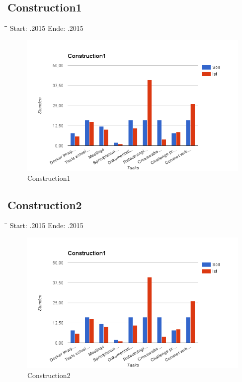 \subsection{Construction1}
\begin{tabbing}[H]
    \hspace*{3cm}\=\hspace*{5cm}\=\hspace*{3cm}\=\hspace*{3cm}\= \kill
    Start: .2015 \>	Ende: .2015 \\
\end{tabbing}
\begin{figure}[H]
\centering
\includegraphics[width=390pt]{images/construction1.png}
\caption[Construction1]{Construction1}
\end{figure}

\subsection{Construction2}
\begin{tabbing}[H]
    \hspace*{3cm}\=\hspace*{5cm}\=\hspace*{3cm}\=\hspace*{3cm}\= \kill
    Start: .2015 \>	Ende: .2015 \\
\end{tabbing}
\begin{figure}[H]
\centering
\includegraphics[width=390pt]{images/construction1.png}
\caption[Construction2]{Construction2}
\end{figure}

